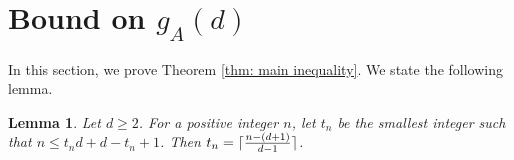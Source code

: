 \documentclass[11pt]{amsart}
\newtheorem{proposition}[theorem]{Proposition}
\newtheorem{lemma}[theorem]{Lemma}
\theoremstyle{definition}
\newcommand{\gz}{\Gamma}
\newcommand{\PPP}{\mathbb{P}}
\newcommand{\bg}{\overline{\Gamma}}
\DeclarePairedDelimiter\ceil{\lceil}{\rceil}
\begin{document}


\section{Bound on $g_A(d)$}\label{Section: Artinian tail}











In this section, we prove Theorem \ref{thm: main inequality}. We state the following lemma.
\begin{lemma}\label{lem: ceil}
Let $d\geq2$.
For a positive integer $n$, let $t_n$ be the smallest integer such that $n\le t_n d+d-t_n+1$. Then $t_n=\ceil{\tfrac{n-(d+1)}{d-1}}$.
\end{lemma}
\end{document}
